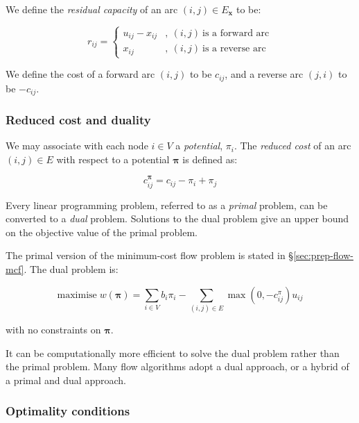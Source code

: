 We define the \emph{residual capacity} of an arc $(i,j)\in E_{\mathbf{x}}$
to be:

\begin{equation}
r_{ij}=\begin{cases}
u_{ij}-x_{ij} & ,\:(i,j)\:\mbox{is a forward arc}\\
x_{ij} & ,\:(i,j)\:\mbox{is a reverse arc}
\end{cases}
\end{equation}

We define the cost of a forward arc $(i,j)$ to be $c_{ij}$, and
a reverse arc $(j,i)$ to be $-c_{ij}$.


\subsubsection{Reduced cost and duality} \label{sec:prep-flow-rc-and-dual}

We may associate with each node $i\in V$ a \emph{potential}, $\pi_{i}$.
The \emph{reduced cost} of an arc $(i,j)\in E$ with respect to a
potential $\boldsymbol{\pi}$ is defined as:

\begin{equation}
c_{ij}^{\boldsymbol{\pi}}=c_{ij}-\pi_{i}+\pi_{j}
\end{equation}


Every linear programming problem, referred to as a \emph{primal} problem,
can be converted to a \emph{dual} problem. Solutions to the dual problem
give an upper bound on the objective value of the primal problem.

The primal version of the minimum-cost flow problem is stated in \S\ref{sec:prep-flow-mcf}. The dual problem is:

\begin{equation}
\mathrm{maximise}\; w(\boldsymbol{\pi})=\sum_{i\in V}b_{i}\pi_{i}-\sum_{(i,j)\in E}\max\left(0,-c_{ij}^{\pi}\right)u_{ij}
\end{equation}

with no constraints on $\boldsymbol{\pi}$.

It can be computationally more efficient to solve the dual problem
rather than the primal problem. Many flow algorithms adopt a dual
approach, or a hybrid of a primal and dual approach.

\subsubsection{Optimality conditions} \label{prep:flow-optimality}

